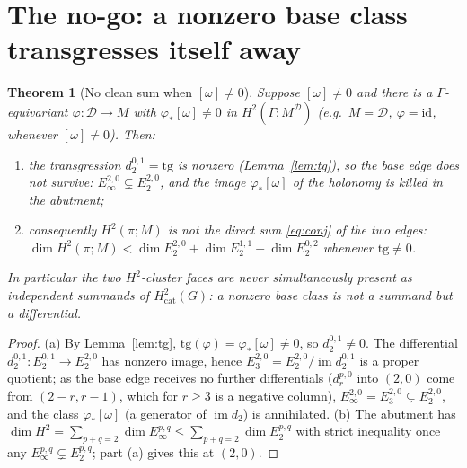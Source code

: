 \documentclass[11pt]{article}
\newtheorem{theorem}{Theorem}
\theoremstyle{definition}
\newcommand{\id}{\mathrm{id}}
\newcommand{\D}{\mathcal{D}}
\newcommand{\tg}{\mathrm{tg}}
\newcommand{\im}{\operatorname{im}}
\begin{document}
\section{The no-go: a nonzero base class transgresses itself away}

\begin{theorem}[{No clean sum when $[\omega]\neq0$}]\label{thm:nogo}
Suppose $[\omega]\neq0$ and there is a $\Gamma$-equivariant $\varphi\colon\D\to M$
with $\varphi_*[\omega]\neq0$ in $H^2(\Gamma;M^\D)$ \textup{(}e.g.\ $M=\D$,
$\varphi=\id$, whenever $[\omega]\neq0$\textup{)}. Then:
\begin{enumerate}
\item[\textup{(a)}] the transgression $d_2^{0,1}=\tg$ is nonzero
\textup{(}Lemma~\ref{lem:tg}\textup{)}, so the base edge does not survive:
$E_\infty^{2,0}\subsetneq E_2^{2,0}$, and the image $\varphi_*[\omega]$ of the
holonomy is \emph{killed} in the abutment;
\item[\textup{(b)}] consequently $H^2(\pi;M)$ is \emph{not} the direct sum
\eqref{eq:conj} of the two edges: $\dim H^2(\pi;M)<\dim E_2^{2,0}+\dim E_2^{1,1}
+\dim E_2^{0,2}$ whenever $\tg\neq0$.
\end{enumerate}
In particular the two $H^2$-cluster faces are \emph{never} simultaneously present
as independent summands of $H^2_{\mathrm{cat}}(G)$: a nonzero base class is not a
summand but a differential.
\end{theorem}
\begin{proof}
(a) By Lemma~\ref{lem:tg}, $\tg(\varphi)=\varphi_*[\omega]\neq0$, so
$d_2^{0,1}\neq0$. The differential $d_2^{0,1}\colon E_2^{0,1}\to E_2^{2,0}$ has
nonzero image, hence $E_3^{2,0}=E_2^{2,0}/\im d_2^{0,1}$ is a proper quotient;
as the base edge receives no further differentials
($d_r^{p,0}$ into $(2,0)$ come from $(2-r,r-1)$, which for $r\ge3$ is a negative
column), $E_\infty^{2,0}=E_3^{2,0}\subsetneq E_2^{2,0}$, and the class
$\varphi_*[\omega]$ (a generator of $\im d_2$) is annihilated. (b) The abutment
has $\dim H^2=\sum_{p+q=2}\dim E_\infty^{p,q}\le\sum_{p+q=2}\dim E_2^{p,q}$ with
strict inequality once any $E_\infty^{p,q}\subsetneq E_2^{p,q}$; part (a) gives
this at $(2,0)$.
\end{proof}
\end{document}
